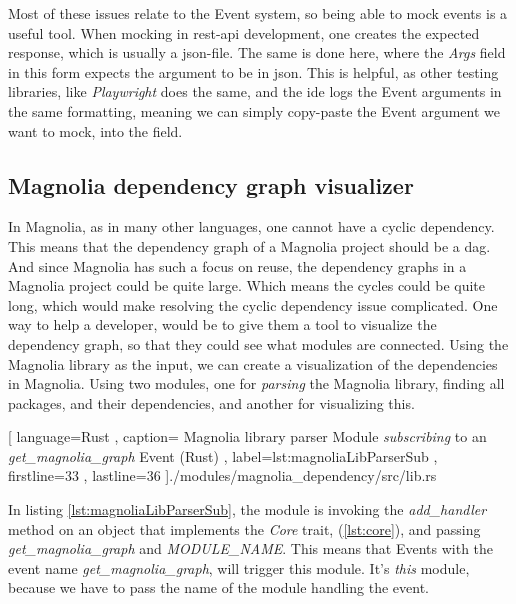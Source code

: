 Most of these issues relate to the Event system, so being able to mock events
is a useful tool. When mocking in \gls*{rest}-\gls*{api} development, one
creates the expected response, which is usually a \gls*{json}-file. The same is
done here, where the \textit{Args} field in this form expects the argument to be
in \gls*{json}. This is helpful, as other testing libraries, like
\textit{Playwright} does the same, and the \gls*{ide} logs the Event arguments
in the same formatting, meaning we can simply copy-paste the Event argument we
want to mock, into the field.

\subsection{Magnolia dependency graph visualizer}

In Magnolia, as in many other languages, one cannot have a cyclic dependency.
This means that the dependency graph of a Magnolia project should be a
\gls*{dag}. And since Magnolia has such a focus on reuse, the dependency graphs
in a Magnolia project could be quite large. Which means the cycles could be
quite long, which would make resolving the cyclic dependency issue complicated.
One way to help a developer, would be to give them a tool to visualize the
dependency graph, so that they could see what modules are connected. Using the
Magnolia library as the input, we can create a visualization of the dependencies
in Magnolia. Using two modules, one for \textit{parsing} the Magnolia library,
finding all packages, and their dependencies, and another for visualizing
this.

\begin{center}
  
    [ language=Rust
    , caption={
      Magnolia library parser Module \textit{subscribing} to an
      \textit{get\_magnolia\_graph } Event (Rust)
    }
    , label=lst:magnoliaLibParserSub
    , firstline=33
    , lastline=36
    ]{./modules/magnolia\_dependency/src/lib.rs}
\end{center}

In listing \ref{lst:magnoliaLibParserSub}, the module is invoking the
\textit{add\_handler} method on an object that implements the \textit{Core} trait,
(\ref{lst:core}), and passing \textit{get\_magnolia\_graph} and
\textit{MODULE\_NAME}. This means that Events with the event name
\textit{get\_magnolia\_graph}, will trigger this module. It's \textit{this}
module, because we have to pass the name of the module handling the event.

